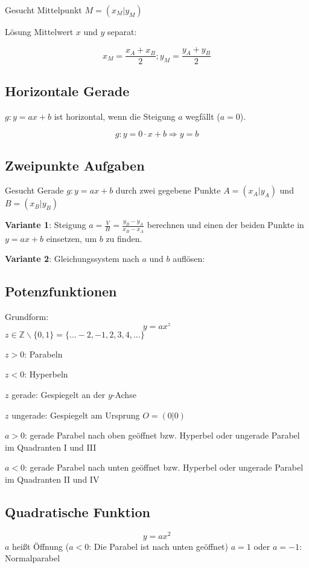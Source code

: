 \begin{multicols}{2}
Gesucht Mittelpunkt $M=(x_M|y_M)$

Lösung Mittelwert $x$ und $y$ separat:

$$x_M = \frac{x_A+x_B}2; y_M=\frac{y_A+y_B}2$$

\subsection{Horizontale Gerade}

$g: y=ax+b$ ist horizontal, wenn die Steigung $a$ wegfällt ($a=0$).

$$g:  y=0\cdot{}x+b \Rightarrow y=b$$

\subsection{Zweipunkte Aufgaben}
Gesucht Gerade $g: y=ax+b$ durch zwei gegebene Punkte $A=(x_A|y_A)$
und $B=(x_B|y_B)$

\textbf{Variante 1}: Steigung $a = \frac{V}H
= \frac{y_B-y_A}{x_B-x_A}$ berechnen und einen der beiden Punkte in
$y=ax+b$ einsetzen, um $b$ zu finden.

\textbf{Variante 2}: Gleichungssystem nach $a$ und $b$ auf\/lösen:


\subsection{Potenzfunktionen}
Grundform:
$$y=ax^z$$
$z\in\mathbb{Z}\backslash\{0,1\} = \{...-2, -1, 2, 3, 4, ...\}$

$z>0$: Parabeln

$z<0$: Hyperbeln

$z$ gerade: Gespiegelt an der $y$-Achse

$z$ ungerade: Gespiegelt am Ursprung $O=(0|0)$

$a>0$: gerade Parabel nach oben geöffnet bzw. Hyperbel oder ungerade
Parabel im Quadranten I und III

$a<0$: gerade Parabel nach unten geöffnet bzw. Hyperbel oder ungerade
Parabel im Quadranten II und IV


\subsection{Quadratische Funktion}
$$y=ax^2$$
$a$ heißt Öffnung ($a<0$: Die Parabel ist nach unten geöffnet)
$a=1$ oder $a=-1$: Normalparabel


\end{multicols}
